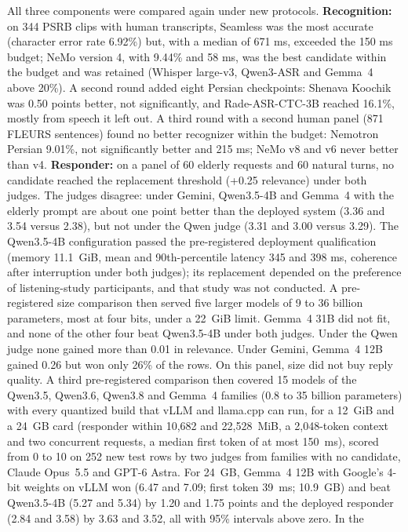 All three components were compared again under new protocols.
\textbf{Recognition:} on 344 PSRB clips with human transcripts, Seamless was the
most accurate (character error rate 6.92\%) but, with a median of 671 ms, exceeded
the 150 ms budget; NeMo version 4, with 9.44\% and 58 ms, was the best candidate
within the budget and was retained (Whisper large-v3, Qwen3-ASR and Gemma~4 above
20\%). A second round added eight Persian checkpoints: Shenava Koochik was 0.50
points better, not significantly, and Rade-ASR-CTC-3B reached 16.1\%, mostly from
speech it left out. A third round with a second human panel (871 FLEURS sentences) found
no better recognizer within the budget: Nemotron Persian 9.01\%, not significantly better
and 215 ms; NeMo v8 and v6 never better than v4. \textbf{Responder:} on a panel of 60 elderly requests and 60 natural turns,
no candidate reached the replacement threshold (+0.25 relevance) under both
judges. The judges disagree: under Gemini, Qwen3.5-4B and Gemma~4 with the elderly
prompt are about one point better than the deployed system (3.36 and 3.54 versus
2.38), but not under the Qwen judge (3.31 and 3.00 versus 3.29). The Qwen3.5-4B
configuration passed the pre-registered deployment qualification (memory
11.1~GiB, mean and 90th-percentile latency 345 and 398 ms, coherence after
interruption under both judges); its replacement depended on the preference of
listening-study participants, and that study was not conducted. A pre-registered size comparison then served
five larger models of 9 to 36 billion parameters, most at four bits, under a
22~GiB limit. Gemma~4 31B did not fit, and none of the other four beat
Qwen3.5-4B under both judges. Under the Qwen judge none gained more than 0.01
in relevance. Under Gemini, Gemma~4 12B gained 0.26 but won only 26\% of the
rows. On this panel, size did not buy reply quality. A third pre-registered
comparison then covered 15 models of the Qwen3.5, Qwen3.6, Qwen3.8 and Gemma~4
families (0.8 to 35 billion parameters) with every quantized build that vLLM and
llama.cpp can run, for a 12~GiB and a 24~GB card (responder within 10,682 and
22,528~MiB, a 2,048-token context and two concurrent requests, a median first token
of at most 150~ms), scored from 0 to 10 on 252 new test rows by two judges from
families with no candidate, Claude Opus~5.5 and GPT-6 Astra. For 24~GB, Gemma~4 12B
with Google's 4-bit weights on vLLM won (6.47 and 7.09; first token 39~ms; 10.9~GB)
and beat Qwen3.5-4B (5.27 and 5.34) by 1.20 and 1.75 points and the deployed
responder (2.84 and 3.58) by 3.63 and 3.52, all with 95\% intervals above zero. In the
